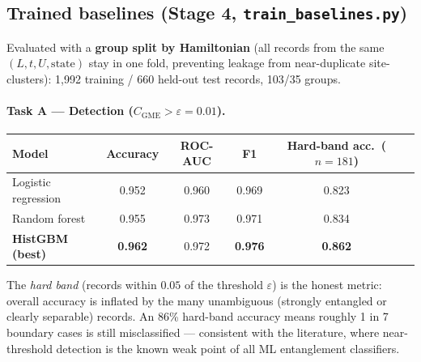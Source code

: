 \documentclass[11pt]{article}
\newcommand{\code}[1]{\texttt{\small #1}}
\newcommand{\CGME}{\ensuremath{C_{\mathrm{GME}}}}
\begin{document}
\subsection{Trained baselines (Stage 4, \code{train\_baselines.py})}
Evaluated with a \textbf{group split by Hamiltonian} (all records from the same
$(L,t,U,\text{state})$ stay in one fold, preventing leakage from near-duplicate
site-clusters): 1{,}992 training / 660 held-out test records, 103/35 groups.

\paragraph{Task A --- Detection ($\CGME{}>\varepsilon=0.01$).}
\begin{center}
\begin{tabular}{@{}lccccc@{}}
\toprule
Model & Accuracy & ROC-AUC & F1 & Hard-band acc.\ ($n{=}181$) \\
\midrule
Logistic regression & 0.952 & 0.960 & 0.969 & 0.823 \\
Random forest        & 0.955 & 0.973 & 0.971 & 0.834 \\
\textbf{HistGBM (best)} & \textbf{0.962} & 0.972 & \textbf{0.976} & \textbf{0.862} \\
\bottomrule
\end{tabular}
\end{center}
The \emph{hard band} (records within $0.05$ of the threshold $\varepsilon$) is
the honest metric: overall accuracy is inflated by the many unambiguous
(strongly entangled or clearly separable) records. An 86\% hard-band accuracy
means roughly 1 in 7 boundary cases is still misclassified --- consistent with
the literature, where near-threshold detection is the known weak point of all
ML entanglement classifiers.
\end{document}
